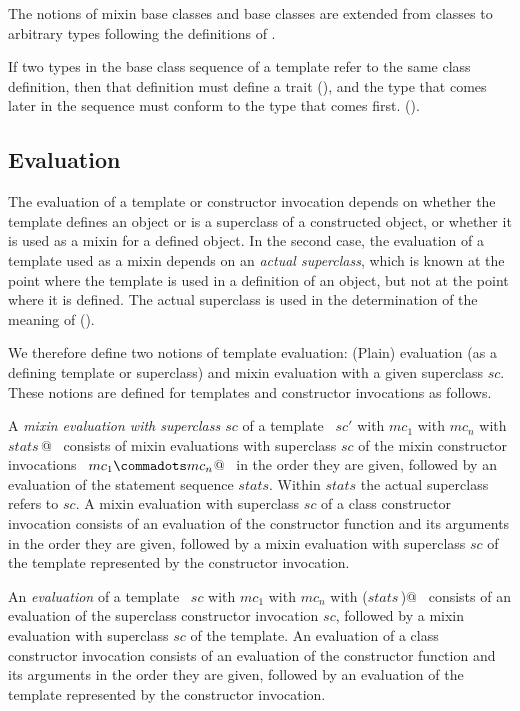 \documentclass[a4paper,12pt,twoside,titlepage]{book}
\begin{document}
The notions of mixin base classes and base classes are extended from
classes to arbitrary types following the definitions of
.
 
If two types in the base class sequence of a template refer to the
same class definition, then that definition must define a trait
(), and the type that comes later in the sequence must
conform to the type that comes first. 
().

\subsection{Evaluation}

The evaluation of a template or constructor invocation depends on
whether the template defines an object or is a superclass of a
constructed object, or whether it is used as a mixin for a defined
object.  In the second case, the evaluation of a template used as a
mixin depends on an {\em actual superclass}, which is known at the
point where the template is used in a definition of an object, but not
at the point where it is defined. The actual superclass is used in the
determination of the meaning of  ().

We therefore define two notions of template evaluation: (Plain)
evaluation (as a defining template or superclass) and mixin evaluation
with a given superclass $sc$. These notions are defined for templates
and constructor invocations as follows.

A {\em mixin evaluation with superclass $sc$} of a template
~\lstinline@$sc'$ with $mc_1$ with $mc_n$ with {$stats\,$}@~ consists of mixin
evaluations with superclass $sc$ of the mixin constructor invocations
~\lstinline@$mc_1 \commadots mc_n$@~ in the order they are given, followed by an
evaluation of the statement sequence $stats$.  Within $stats$ the
actual superclass refers to $sc$.  A mixin evaluation with superclass
$sc$ of a class constructor invocation  consists of an evaluation
of the constructor function and its arguments in the order they are
given, followed by a mixin evaluation with superclass $sc$ of the
template represented by the constructor invocation.

An {\em evaluation} of a template
~\lstinline@$sc$ with $mc_1$ with $mc_n$ with ($stats\,$)@~ consists of an evaluation of
the superclass constructor invocation $sc$,
followed by a mixin evaluation with superclass $sc$ of the template. An
evaluation of a class constructor invocation  consists of an
evaluation of the constructor function and its arguments in
the order they are given, followed by an evaluation of the template
represented by the constructor invocation.
\end{document}
